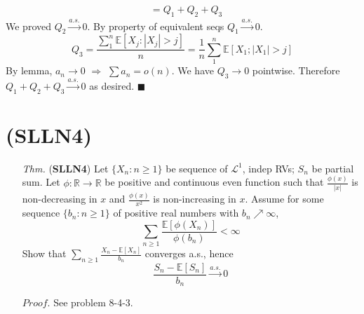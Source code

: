\documentclass[a4paper,12pt,twoside]{book}
\begin{document}
\begin{itemize}
\begin{equation}
\begin{split}
			&=Q_1+Q_2+Q_3
		\end{split}
	\end{equation}
	We proved $Q_2 \xrightarrow{a.s.}0$. \newline
	By property of equivalent seqs $Q_1 \xrightarrow{a.s.} 0$.\newline
	\begin{equation}
		Q_3 = \frac{\sum_1^n \mathbb{E}\left[X_j:|X_j|>j\right]}{n}=\frac{1}{n}\sum_1^n \mathbb{E}\left[X_1; |X_1|>j\right]
	\end{equation}
	By lemma, $a_n \to 0$ $\Rightarrow$ $\sum a_n = o(n)$. We have $Q_3 \to 0$ pointwise. Therefore $Q_1+Q_2+Q_3 \xrightarrow{a.s.} 0$ as desired. $\blacksquare$
\end{itemize}

\section{(SLLN4)}
\begin{itemize}
	\item[\textit{Thm.}] (\textbf{SLLN4}) Let $\{X_n: n\geq 1\}$ be sequence of $\mathcal{L}^1$, indep RVs; $S_n$ be partial sum. Let $\phi: \mathbb{R}\to \mathbb{R}$ be positive and continuous even function such that $\frac{\phi(x)}{|x|}$ is non-decreasing in $x$ and $\frac{\phi(x)}{x^2}$ is non-increasing in $x$. Assume for some sequence $\{b_n: n\geq 1\}$ of positive real numbers with $b_n \nearrow \infty$,
	\begin{equation}
		\sum_{n\geq 1}\frac{\mathbb{E}\left[\phi(X_n)\right]}{\phi(b_n)}<\infty
	\end{equation}
	Show that $\sum_{n\geq 1}\frac{X_n - \mathbb{E}\left[X_n\right]}{b_n}$ converges a.s., hence
	\begin{equation}
		\frac{S_n - \mathbb{E}\left[S_n\right]}{b_n} \xrightarrow{a.s.} 0
	\end{equation}

	\item[$Proof$.] See problem 8-4-3.
\end{itemize}

\end{document}
